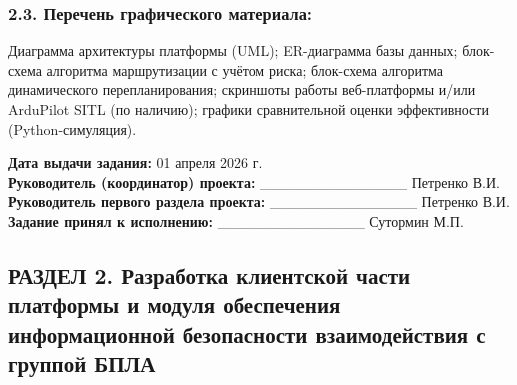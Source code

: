 \documentclass[14pt,a4paper]{extarticle}
\begin{document}
\hypertarget{ux43fux435ux440ux435ux447ux435ux43dux44c-ux433ux440ux430ux444ux438ux447ux435ux441ux43aux43eux433ux43e-ux43cux430ux442ux435ux440ux438ux430ux43bux430}{%
\subsubsection{2.3. Перечень графического материала:}\label{ux43fux435ux440ux435ux447ux435ux43dux44c-ux433ux440ux430ux444ux438ux447ux435ux441ux43aux43eux433ux43e-ux43cux430ux442ux435ux440ux438ux430ux43bux430}}

Диаграмма архитектуры платформы (UML); ER-диаграмма базы данных; блок-схема алгоритма маршрутизации с учётом риска; блок-схема алгоритма динамического перепланирования; скриншоты работы веб-платформы и/или ArduPilot SITL (по наличию); графики сравнительной оценки эффективности (Python-симуляция).

\textbf{Дата выдачи задания:} 01 апреля 2026 г.\\
\textbf{Руководитель (координатор) проекта:} \_\_\_\_\_\_\_\_\_\_\_\_\_\_ Петренко В.И.\\
\textbf{Руководитель первого раздела проекта:} \_\_\_\_\_\_\_\_\_\_\_\_\_\_ Петренко В.И.\\
\textbf{Задание принял к исполнению:} \_\_\_\_\_\_\_\_\_\_\_\_\_\_ Сутормин М.П.


\hypertarget{ux440ux430ux437ux434ux435ux43b-2.-ux440ux430ux437ux440ux430ux431ux43eux442ux43aux430-ux43aux43bux438ux435ux43dux442ux441ux43aux43eux439-ux447ux430ux441ux442ux438-ux43fux43bux430ux442ux444ux43eux440ux43cux44b-ux438-ux43cux43eux434ux443ux43bux44f-ux43eux431ux435ux441ux43fux435ux447ux435ux43dux438ux44f-ux438ux43dux444ux43eux440ux43cux430ux446ux438ux43eux43dux43dux43eux439-ux431ux435ux437ux43eux43fux430ux441ux43dux43eux441ux442ux438-ux432ux437ux430ux438ux43cux43eux434ux435ux439ux441ux442ux432ux438ux44f-ux441-ux433ux440ux443ux43fux43fux43eux439-ux431ux43fux43bux430}{%
\subsection{РАЗДЕЛ 2. Разработка клиентской части платформы и модуля обеспечения информационной безопасности взаимодействия с группой БПЛА}\label{ux440ux430ux437ux434ux435ux43b-2.-ux440ux430ux437ux440ux430ux431ux43eux442ux43aux430-ux43aux43bux438ux435ux43dux442ux441ux43aux43eux439-ux447ux430ux441ux442ux438-ux43fux43bux430ux442ux444ux43eux440ux43cux44b-ux438-ux43cux43eux434ux443ux43bux44f-ux43eux431ux435ux441ux43fux435ux447ux435ux43dux438ux44f-ux438ux43dux444ux43eux440ux43cux430ux446ux438ux43eux43dux43dux43eux439-ux431ux435ux437ux43eux43fux430ux441ux43dux43eux441ux442ux438-ux432ux437ux430ux438ux43cux43eux434ux435ux439ux441ux442ux432ux438ux44f-ux441-ux433ux440ux443ux43fux43fux43eux439-ux431ux43fux43bux430}}
\end{document}
